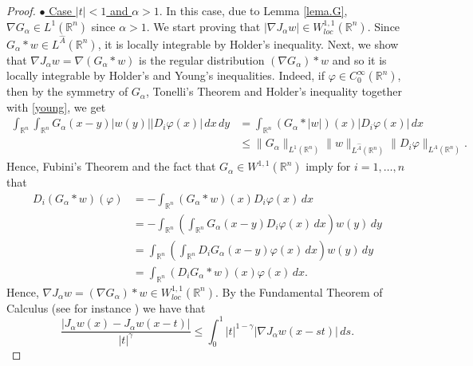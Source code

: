 \documentclass[leqno,twoside, 12pt]{amsart}
\theoremstyle{plain}
\numberwithin{equation}{section} \numberwithin{figure}{section}
\theoremstyle{definition}
\newcommand{\R}{\mathbb R}
\numberwithin{equation}{section}
\begin{document}
\begin{proof}
\noindent \underline{$\bullet$ Case $|t|<1$ and $\alpha>1$}. In this case, due to Lemma \ref{lema.G}, $\nabla G_\alpha\in L^1(\R^n)$ since $\alpha>1$.   We start  proving that $|\nabla J_\alpha w|\in W_{loc}^{1, 1}(\R^n)$. Since $G_\alpha*w \in L^{\hat A}(\R^n)$, it is locally integrable by Holder's inequality. Next, we show that $\nabla J_\alpha w= \nabla(G_\alpha*w)$ is the regular distribution $(\nabla G_\alpha)*w $ and so it is locally integrable by Holder's and Young's inequalities.  Indeed, if $\varphi\in C_0^{\infty}(\R^n)$, then by the symmetry of $G_\alpha$, Tonelli's Theorem and Holder's inequality together with \eqref{young}, we get
\begin{equation*}
\begin{split}
\int_{\R^n}\int_{\R^n}G_\alpha(x-y)|w(y)||D_i \varphi(x)|\,dx\,dy & = \int_{\R^n}(G_\alpha*|w|)(x)|D_i\varphi(x)|\,dx \\& \leq \|G_\alpha\|_{L^1(\R^n)}\|w\|_{L^{\hat A}(\R^n)}\|D_i\varphi\|_{L^A(\R^n)}.
\end{split}
\end{equation*}Hence, Fubini's Theorem and the fact that $G_\alpha\in W^{1, 1}(\R^n)$ imply for $i=1, \ldots, n$ that
\begin{equation}
\begin{split}
D_i (G_\alpha*w)(\varphi)&=-\int_{\R^n}(G_\alpha*w)(x)D_i\varphi(x)\,dx \\ & = -\int_{\R^n}\left(\int_{\R^n}G_\alpha(x-y)D_i\varphi(x)\,dx\right)w(y)\,dy \\& = \int_{\R^n}\left(\int_{\R^n}D_iG_\alpha(x-y)\varphi(x)\,dx\right)w(y)\,dy \\ & =\int_{\R^n}(D_iG_\alpha* w)(x)\varphi(x)\,dx.
\end{split}
\end{equation}Hence, $\nabla J_\alpha w=(\nabla G_\alpha)*w \in W_{loc}^{1, 1}(\R^n)$. 
\normalcolor
By the Fundamental Theorem of Calculus (see for instance \cite[Theorem 6.9]{LL}) we have that
$$
\frac{|J_\alpha w(x) - J_\alpha w(x-t)|}{|t|^\gamma} \leq \int_0^1 |t|^{1-\gamma}  |\nabla J_\alpha w(x - st)| \, ds.
$$



\end{proof}
\end{document}
